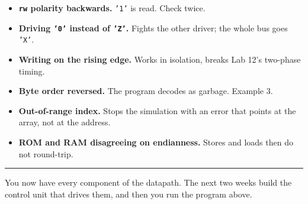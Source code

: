 \documentclass[11pt]{article}
\newcommand{\code}[1]{\texttt{#1}}
\newcommand{\hr}{\vspace{2pt}\hrule\vspace{6pt}}
\begin{document}
\begin{itemize}[leftmargin=1.6em,itemsep=1pt]
\item \textbf{\code{rw} polarity backwards.} \code{'1'} is read. Check twice.
\item \textbf{Driving \code{'0'} instead of \code{'Z'}.} Fights the other
driver; the whole bus goes \code{'X'}.
\item \textbf{Writing on the rising edge.} Works in isolation, breaks Lab 12's
two-phase timing.
\item \textbf{Byte order reversed.} The program decodes as garbage. Example 3.
\item \textbf{Out-of-range index.} Stops the simulation with an error that
points at the array, not at the address.
\item \textbf{ROM and RAM disagreeing on endianness.} Stores and loads then do
not round-trip.
\end{itemize}

\vspace{10pt}
\hr
{\small You now have every component of the datapath. The next two weeks build
the control unit that drives them, and then you run the program above.}
\end{document}
